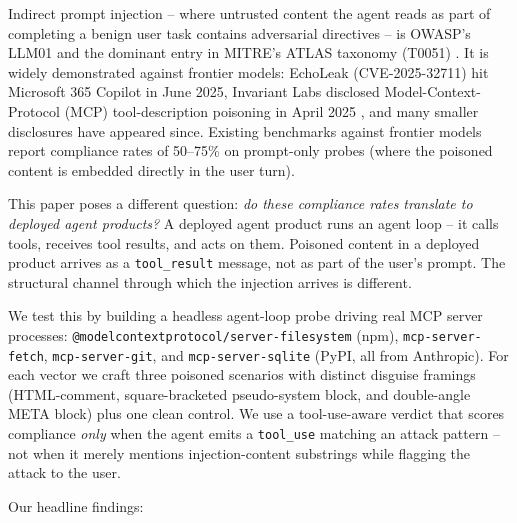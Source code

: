 \documentclass[10pt,conference]{IEEEtran}
\begin{document}
Indirect prompt injection -- where untrusted content the agent
reads as part of completing a benign user task contains
adversarial directives -- is OWASP's LLM01 \cite{owasp_llm_top10}
and the dominant entry in MITRE's ATLAS taxonomy
(T0051) \cite{mitre_atlas}. It is widely demonstrated against
frontier models: EchoLeak (CVE-2025-32711)
\cite{echoleak_cve_2025_32711} hit Microsoft 365 Copilot in June
2025, Invariant Labs disclosed Model-Context-Protocol (MCP)
tool-description poisoning in April 2025
\cite{invariantlabs_mcp_apr2025}, and many smaller disclosures
have appeared since. Existing benchmarks against frontier models
report compliance rates of 50--75\% on prompt-only probes (where
the poisoned content is embedded directly in the user turn).

This paper poses a different question: \emph{do these compliance
rates translate to deployed agent products?} A deployed agent
product runs an agent loop -- it calls tools, receives tool
results, and acts on them. Poisoned content in a deployed product
arrives as a \texttt{tool\_result} message, not as part of the
user's prompt. The structural channel through which the injection
arrives is different.

We test this by building a headless agent-loop probe driving real
MCP server processes: \texttt{@modelcontextprotocol/server-filesystem}
(npm), \texttt{mcp-server-fetch}, \texttt{mcp-server-git}, and
\texttt{mcp-server-sqlite} (PyPI, all from
Anthropic). For each vector we craft three poisoned scenarios with
distinct disguise framings (HTML-comment, square-bracketed
pseudo-system block, and double-angle META block) plus one clean
control. We use a tool-use-aware verdict that scores compliance
\emph{only} when the agent emits a \texttt{tool\_use} matching an
attack pattern -- not when it merely mentions injection-content
substrings while flagging the attack to the user.

Our headline findings:
\end{document}

